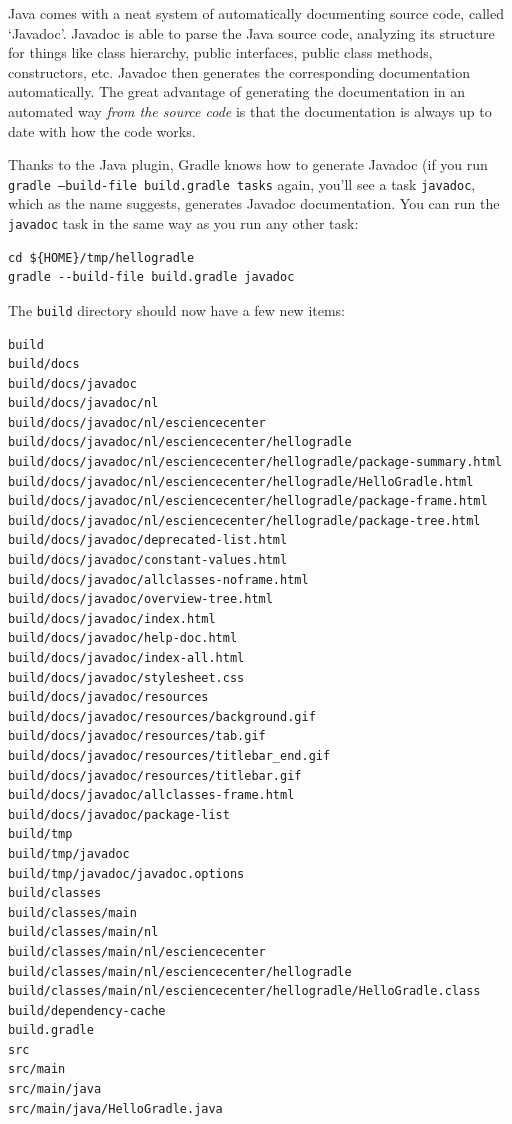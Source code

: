 \documentclass[12pt, a4paper, twoside,openany,titlepage]{article}
\begin{document}
Java comes with a neat system of automatically documenting source code, called `Javadoc'. Javadoc is able to parse the Java source code, analyzing its structure for things like class hierarchy, public interfaces, public class methods, constructors, etc. Javadoc then generates the corresponding documentation automatically. The great advantage of generating the documentation in an automated way \textit{from the source code} is that the documentation is always up to date with how the code works.

Thanks to the Java plugin, Gradle knows how to generate Javadoc (if you run \texttt{gradle --build-file build.gradle tasks} again, you'll see a task \texttt{javadoc}, which as the name suggests, generates Javadoc documentation. You can run the \texttt{javadoc} task in the same way as you run any other task:
\begin{lstlisting}[style=basic,style=bash]
cd ${HOME}/tmp/hellogradle
gradle --build-file build.gradle javadoc
\end{lstlisting} %

The \texttt{build} directory should now have a few new items:
\begin{lstlisting}[style=basic,style=bash]
build
build/docs
build/docs/javadoc
build/docs/javadoc/nl
build/docs/javadoc/nl/esciencecenter
build/docs/javadoc/nl/esciencecenter/hellogradle
build/docs/javadoc/nl/esciencecenter/hellogradle/package-summary.html
build/docs/javadoc/nl/esciencecenter/hellogradle/HelloGradle.html
build/docs/javadoc/nl/esciencecenter/hellogradle/package-frame.html
build/docs/javadoc/nl/esciencecenter/hellogradle/package-tree.html
build/docs/javadoc/deprecated-list.html
build/docs/javadoc/constant-values.html
build/docs/javadoc/allclasses-noframe.html
build/docs/javadoc/overview-tree.html
build/docs/javadoc/index.html
build/docs/javadoc/help-doc.html
build/docs/javadoc/index-all.html
build/docs/javadoc/stylesheet.css
build/docs/javadoc/resources
build/docs/javadoc/resources/background.gif
build/docs/javadoc/resources/tab.gif
build/docs/javadoc/resources/titlebar_end.gif
build/docs/javadoc/resources/titlebar.gif
build/docs/javadoc/allclasses-frame.html
build/docs/javadoc/package-list
build/tmp
build/tmp/javadoc
build/tmp/javadoc/javadoc.options
build/classes
build/classes/main
build/classes/main/nl
build/classes/main/nl/esciencecenter
build/classes/main/nl/esciencecenter/hellogradle
build/classes/main/nl/esciencecenter/hellogradle/HelloGradle.class
build/dependency-cache
build.gradle
src
src/main
src/main/java
src/main/java/HelloGradle.java
\end{lstlisting}
\end{document}
